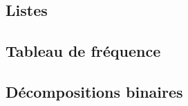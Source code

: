 

\usepackage{parcolumns}
\setlength{\parindent}{0pt}

 

\subsection{Listes}


\subsection{Tableau de fréquence}


\subsection{Décompositions binaires}


